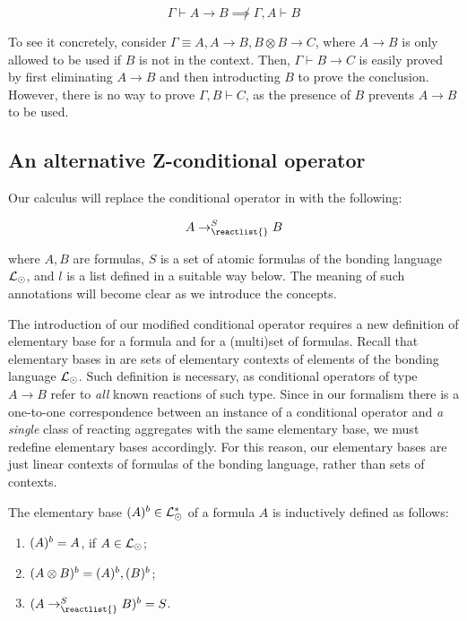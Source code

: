 \[
  \Gamma \vdash A \rightarrow B \not\implies \Gamma, A \vdash B
\]

To see it concretely, consider $\Gamma \equiv A, A \rightarrow B, B \otimes B
\rightarrow C$, where $A \rightarrow B$ is only allowed to be used if $B$ is not
in the context. Then, $\Gamma \vdash B \rightarrow C$ is easily proved by first
eliminating $A \rightarrow B$ and then introducting $B$ to prove the conclusion.
However, there is no way to prove $\Gamma, B \vdash C$, as the presence of $B$
prevents $A \rightarrow B$ to be used.

\subsection{An alternative Z-conditional operator}

Our calculus \eznd{} will replace the conditional operator in \znd{} with the
following:

\[
  A \rightarrow_{\reactlist{}}^S B
\]

where $A,B$ are formulas, $S$ is a set of atomic formulas of the bonding
language $\mathcal{L}_{\odot}$, and $l$ is a list defined in a suitable way below. The
meaning of such annotations will become clear as we introduce the concepts.

The introduction of our modified conditional operator requires a new definition
of elementary base for a formula and for a (multi)set of formulas. Recall that
elementary bases in \cite{adding-logic} are sets of elementary contexts of
elements of the bonding language $\mathcal{L}_{\odot}$. Such definition is necessary,
as conditional operators of type $A \rightarrow B$ refer to \emph{all} known
reactions of such type. Since in our formalism there is a one-to-one
correspondence between an instance of a conditional operator and \emph{a single}
class of reacting aggregates with the same elementary base, we must redefine
elementary bases accordingly. For this reason, our elementary bases are just
linear contexts of formulas of the bonding language, rather than sets of
contexts.

\begin{definition}
  The elementary base $(A)^{b} \in \mathcal{L}_{\odot}^*$ of a formula $A$ is
  inductively defined as follows:

  \begin{enumerate}
  \item $(A)^{b} = A$, if $A \in \mathcal{L}_{\odot}$;
  \item $(A \otimes B)^{b} = (A)^{b}, (B)^{b}$;
  \item $\elembases{A \rightarrow_{\reactlist{}}^S B} = S$.
  \end{enumerate}
\end{definition}


